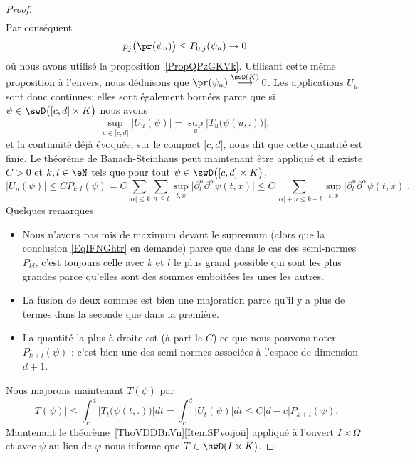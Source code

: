 \begin{proof}
\begin{subequations}
\begin{align}
        \end{align}
    \end{subequations}
    Par conséquent
    \begin{equation}
        p_j\big( \pr(\psi_n) \big)\leq P_{0,j}(\psi_n)\to 0
    \end{equation}
    où nous avons utilisé la proposition~\ref{PropQPzGKVk}. Utilisant cette même proposition à l'envers, nous déduisons que \( \pr(\psi_n)\stackrel{\swD(K)}{\longrightarrow}0\). Les applications \( U_u\) sont donc continues; elles sont également bornées parce que si \( \psi\in\swD\big( \mathopen[ c , d \mathclose]\times K \big) \) nous avons
    \begin{equation}
        \sup_{u \in\mathopen[ c , d \mathclose]}\big| U_u(\psi) \big|=\sup_u \big| T_u\big( \psi(u,.) \big) \big|,
    \end{equation}
    et la continuité déjà évoquée, sur le compact \( \mathopen[ c , d \mathclose]\), nous dit que cette quantité est finie. Le théorème de Banach-Steinhaus peut maintenant être appliqué et il existe \( C>0\) et \( k,l\in \eN\) tels que pour tout \( \psi\in\swD\big( \mathopen[ c , d \mathclose]\times K \big)\),
    \begin{equation}
        \big| U_u(\psi) \big|\leq C P_{k,l}(\psi)=C\sum_{| \alpha |\leq k}\sum_{n\leq l}\sup_{t,x}\big| \partial_t^n\partial^{\alpha}\psi(t,x) \big|\leq C\sum_{| \alpha |+n\leq k+l}\sup_{t,x}\big| \partial_t^n\partial^{\alpha}\psi(t,x) \big|.
    \end{equation}
    Quelques remarques
    \begin{itemize}
        \item Nous n'avons pas mis de maximum devant le supremum (alors que la conclusion \eqref{EqIFNGhtr} en demande) parce que dans le cas des semi-normes \( P_{kl}\), c'est toujours celle avec \( k\) et \( l\) le plus grand possible qui sont les plus grandes parce qu'elles sont des sommes emboitées les unes les autres.
        \item La fusion de deux sommes est bien une majoration parce qu'il y a plus de termes dans la seconde que dans la première.
        \item La quantité la plus à droite est (à part le \( C\)) ce que nous pouvons noter \( P_{k+l}(\psi)\) : c'est bien une des semi-normes associées à l'espace de dimension \( d+1\).
    \end{itemize}
    Nous majorons maintenant \( T(\psi)\) par
    \begin{equation}
            \big| T(\psi) \big|\leq \int_c^d\big| T_t\big( \psi(t,.) \big) \big|dt
            =\int_c^d\big|   U_t(\psi) \big|dt
            \leq C| d-c |P_{k+l}(\psi).
    \end{equation}
    Maintenant le théorème~\ref{ThoVDDBnVn}\ref{ItemSPvoijoii} appliqué à l'ouvert \( I\times \Omega\) et avec \( \psi\) au lieu de \( \varphi\) nous informe que \( T\in\swD(I\times K)\).
\end{proof}

